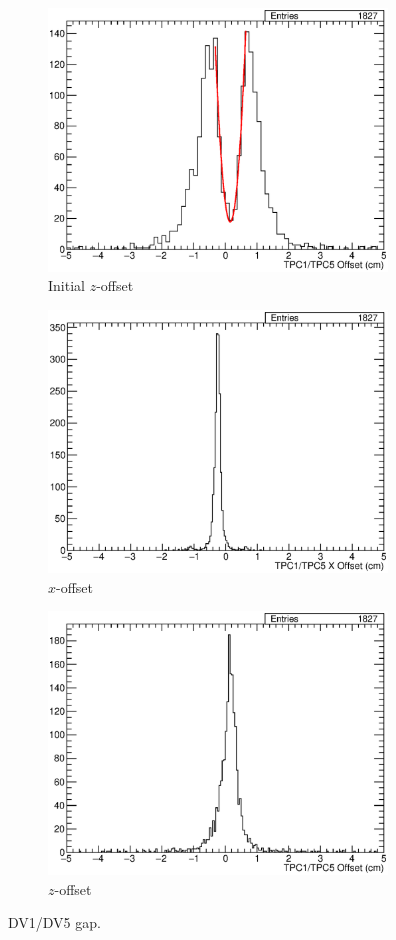 \begin{figure}
  \centering
  \begin{subfigure}[t]{\linewidth}
    \centering
    \includegraphics[width=9cm]{TPC1TPC5Gap.eps}
    \caption{Initial $z$-offset}
    \label{fig:AppendixTPC1TPC5Gap}
  \end{subfigure}
  \vfill
  \begin{subfigure}[t]{\linewidth}
    \centering
    \includegraphics[width=9cm]{TPC1TPC5XOff.eps}
    \caption{$x$-offset}
    \label{fig:AppendixTPC1TPC5XOff}
  \end{subfigure}
  \vfill
  \begin{subfigure}[t]{\linewidth}
    \centering
    \includegraphics[width=9cm]{TPC1TPC5ZOff.eps}
    \caption{$z$-offset}
    \label{fig:AppendixTPC1TPC5ZOff}
  \end{subfigure}
  \caption{DV1/DV5 gap.}
  \label{fig:AppendixTPC1TPC5}
\end{figure}


